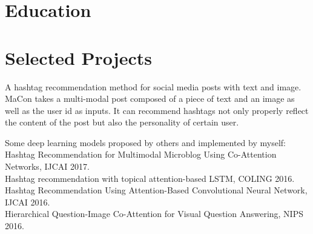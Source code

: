 \documentclass[11pt,a4paper,sans]{moderncv} %
\begin{document}
\makecvtitle %


\section{Education}




\section{Selected Projects}

{A hashtag recommendation method for social media posts with text and image.\\
MaCon takes a multi-modal post composed of a piece of text and an image as well as the user id as inputs. It can recommend hashtags not only properly reflect the content of the post but also the personality of certain user.} 

{Some deep learning models proposed by others and implemented by myself:\\
Hashtag Recommendation for Multimodal Microblog Using Co-Attention Networks, IJCAI 2017.\\
Hashtag recommendation with topical attention-based LSTM, COLING 2016.\\
Hashtag Recommendation Using Attention-Based Convolutional Neural Network, IJCAI 2016.\\
Hierarchical Question-Image Co-Attention for Visual Question Answering, NIPS 2016.
}
\end{document}
